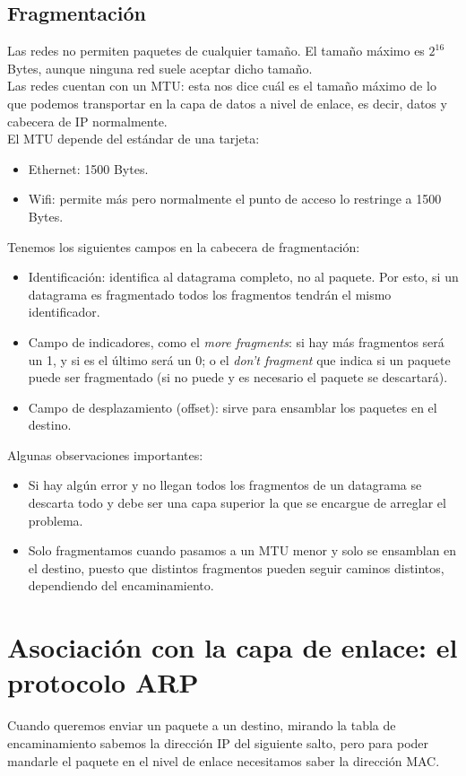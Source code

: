 \subsection{Fragmentación}
Las redes no permiten paquetes de cualquier tamaño. El tamaño máximo es $2^{16}$ Bytes, aunque ninguna red suele aceptar dicho tamaño. \\

Las redes cuentan con un \acrfull{MTU}: esta nos dice cuál es el tamaño máximo de lo que podemos transportar en la capa de datos a nivel de enlace, es decir, datos y cabecera de IP normalmente. \\ 

El \acrshort{MTU} depende del estándar de una tarjeta:
\begin{itemize}
    \item Ethernet: 1500 Bytes.
    \item Wifi: permite más pero normalmente el punto de acceso lo restringe a 1500 Bytes.
\end{itemize}

\noindent
Tenemos los siguientes campos en la cabecera de fragmentación:
\begin{itemize}
    \item Identificación: identifica al datagrama completo, no al paquete. Por esto, si un datagrama es fragmentado todos los fragmentos tendrán el mismo identificador.
    \item Campo de indicadores, como el \textit{more fragments}: si hay más fragmentos será un 1, y si es el último será un 0; o el \textit{don't fragment} que indica si un paquete puede ser fragmentado (si no puede y es necesario el paquete se descartará).
    \item Campo de desplazamiento (offset): sirve para ensamblar los paquetes en el destino. 
\end{itemize}

Algunas observaciones importantes:
\begin{itemize}
    \item Si hay algún error y no llegan todos los fragmentos de un datagrama se descarta todo y debe ser una capa superior la que se encargue de arreglar el problema.
    \item Solo fragmentamos cuando pasamos a un \acrshort{MTU} menor y solo se ensamblan en el destino, puesto que distintos fragmentos pueden seguir caminos distintos, dependiendo del encaminamiento.
\end{itemize}


\section{Asociación con la capa de enlace: el protocolo \acrshort{ARP}}
Cuando queremos enviar un paquete a un destino, mirando la tabla de encaminamiento sabemos la dirección IP del siguiente salto, pero para poder mandarle el paquete en el nivel de enlace necesitamos saber la dirección \acrshort{MAC}. \\

